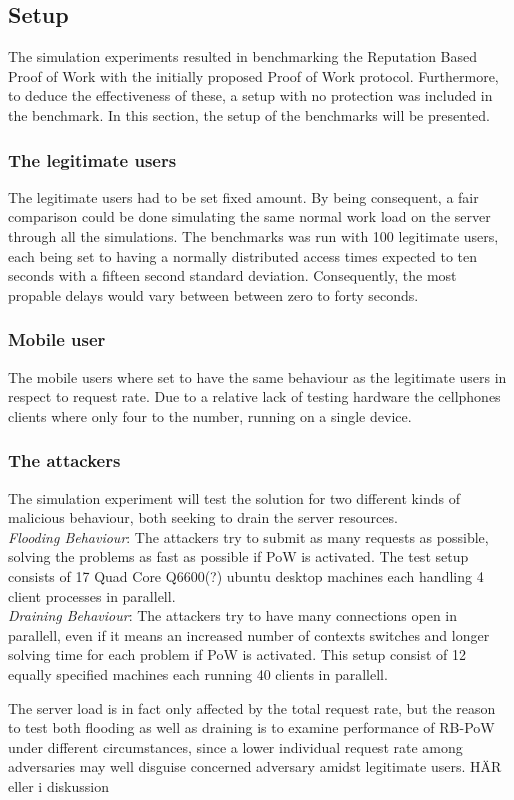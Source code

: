 

\subsection{Setup}
The simulation experiments resulted in benchmarking the Reputation Based Proof of Work with the initially proposed Proof of Work protocol. Furthermore, to deduce the effectiveness of these, a setup with no protection was included in the benchmark. In this section, the setup of the benchmarks will be presented.
\label{text:setup}
\subsubsection{The legitimate users} 
The legitimate users had to be set fixed amount. By being consequent, a fair comparison could be done simulating the same normal work load on the server through all the simulations. The benchmarks was run with 100 legitimate users, each being set to having a normally distributed access times expected to ten seconds with a fifteen second standard deviation. Consequently, the most propable delays would vary between between zero to forty seconds.
\subsubsection{Mobile user}
The mobile users where set to have the same behaviour as the legitimate users in respect to request rate. Due to a relative lack of testing hardware the cellphones clients where only four to the number, running on a single device. 
\subsubsection{The attackers} The simulation experiment will test the solution for two different kinds of malicious behaviour, both seeking to drain the server resources.\\
\emph{Flooding Behaviour}: The attackers try to submit as many requests as possible, solving the problems as fast as possible if PoW is activated. The test setup consists of 17 Quad Core Q6600(?) ubuntu desktop machines each handling 4 client processes in parallell.\\
\emph{Draining Behaviour}: The attackers try to have many connections open in parallell, even if it means an increased number of contexts switches and longer solving time for each problem if PoW is activated. This setup consist of 12 equally specified machines each running 40 clients in parallell.

The server load is in fact only affected by the total request rate, but the reason to test both flooding as well as draining is to examine performance of RB-PoW under different circumstances, since a lower individual request rate among adversaries may well disguise concerned adversary amidst legitimate users. {\color{red} HÄR eller i diskussion}


